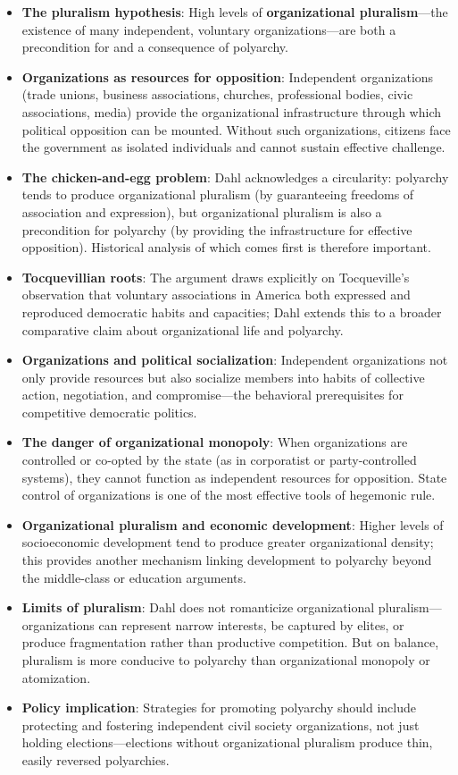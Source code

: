 \documentclass[12pt]{article}
\begin{document}
\begin{itemize}[leftmargin=*, itemsep=4pt]
    \item \textbf{The pluralism hypothesis}: High levels of \textbf{organizational pluralism}---the existence of many independent, voluntary organizations---are both a precondition for and a consequence of polyarchy.
    \item \textbf{Organizations as resources for opposition}: Independent organizations (trade unions, business associations, churches, professional bodies, civic associations, media) provide the organizational infrastructure through which political opposition can be mounted. Without such organizations, citizens face the government as isolated individuals and cannot sustain effective challenge.
    \item \textbf{The chicken-and-egg problem}: Dahl acknowledges a circularity: polyarchy tends to produce organizational pluralism (by guaranteeing freedoms of association and expression), but organizational pluralism is also a precondition for polyarchy (by providing the infrastructure for effective opposition). Historical analysis of which comes first is therefore important.
    \item \textbf{Tocquevillian roots}: The argument draws explicitly on Tocqueville's observation that voluntary associations in America both expressed and reproduced democratic habits and capacities; Dahl extends this to a broader comparative claim about organizational life and polyarchy.
    \item \textbf{Organizations and political socialization}: Independent organizations not only provide resources but also socialize members into habits of collective action, negotiation, and compromise---the behavioral prerequisites for competitive democratic politics.
    \item \textbf{The danger of organizational monopoly}: When organizations are controlled or co-opted by the state (as in corporatist or party-controlled systems), they cannot function as independent resources for opposition. State control of organizations is one of the most effective tools of hegemonic rule.
    \item \textbf{Organizational pluralism and economic development}: Higher levels of socioeconomic development tend to produce greater organizational density; this provides another mechanism linking development to polyarchy beyond the middle-class or education arguments.
    \item \textbf{Limits of pluralism}: Dahl does not romanticize organizational pluralism---organizations can represent narrow interests, be captured by elites, or produce fragmentation rather than productive competition. But on balance, pluralism is more conducive to polyarchy than organizational monopoly or atomization.
    \item \textbf{Policy implication}: Strategies for promoting polyarchy should include protecting and fostering independent civil society organizations, not just holding elections---elections without organizational pluralism produce thin, easily reversed polyarchies.
\end{itemize}
\end{document}
